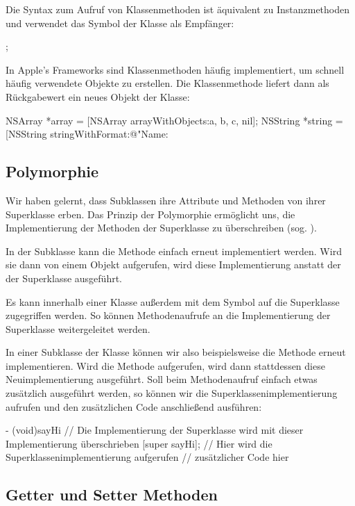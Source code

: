 \documentclass[parskip=half, final]{scrreprt}
\begin{document}
Die Syntax zum Aufruf von Klassenmethoden ist äquivalent zu Instanzmethoden und verwendet das Symbol der Klasse als Empfänger:
\begin{objclst}
;
\end{objclst}
In Apple's Frameworks sind Klassenmethoden häufig implementiert, um schnell häufig verwendete Objekte zu erstellen. Die Klassenmethode liefert dann als Rückgabewert ein neues Objekt der Klasse:
\begin{objclst}
NSArray *array = [NSArray arrayWithObjects:a, b, c, nil];
NSString *string = [NSString stringWithFormat:@"Name: %
\end{objclst}

\subsection{Polymorphie}

Wir haben gelernt, dass Subklassen ihre Attribute und Methoden von ihrer Superklasse erben. Das Prinzip der Polymorphie ermöglicht uns, die Implementierung der Methoden der Superklasse zu überschreiben (sog. ).

In der Subklasse kann die Methode einfach erneut implementiert werden. Wird sie dann von einem Objekt aufgerufen, wird diese Implementierung anstatt der der Superklasse ausgeführt.

Es kann innerhalb einer Klasse außerdem mit dem Symbol  auf die Superklasse zugegriffen werden. So können Methodenaufrufe an die Implementierung der Superklasse weitergeleitet werden.

In einer Subklasse der Klasse  können wir also beispielsweise die Methode  erneut implementieren. Wird die Methode aufgerufen, wird dann stattdessen diese Neuimplementierung ausgeführt. Soll beim Methodenaufruf einfach etwas zusätzlich ausgeführt werden, so können wir die Superklassenimplementierung aufrufen und den zusätzlichen Code anschließend ausführen:

\begin{objclst}
- (void)sayHi { // Die Implementierung der Superklasse wird mit dieser Implementierung überschrieben
    [super sayHi]; // Hier wird die Superklassenimplementierung aufgerufen
    // zusätzlicher Code hier
}
\end{objclst}

\subsection{Getter und Setter Methoden}\label{sec:gettersetter}
\end{document}
